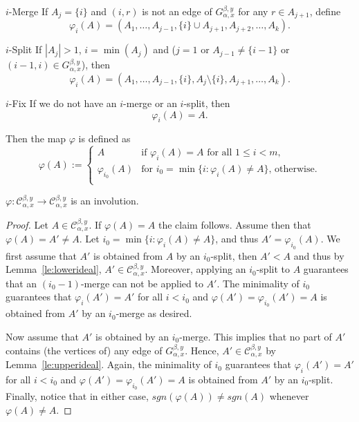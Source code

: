 \documentclass[ALCO,ThmDefs,Unicode,epreuves]{cedram}
\begin{document}
\begin{enonce*}{$i$-Merge} If $A_j=\{i\}$ and $(i,r)$ is not an edge of $G_{\alpha,x}^{\beta,y}$ for any $r\in A_{j+1}$, 
define
 $$ \varphi_i(A)=(A_1,\ldots,A_{j-1},\{i\}\cup A_{j+1},A_{j+2},\ldots, A_k).$$
\end{enonce*}


\begin{enonce*}{$i$-Split} If $|A_j|>1$, $i=\min(A_j)$ and \big($j=1$ or $A_{j-1}\ne\{i-1\}$ or $(i-1,i)\in G_{\alpha,x}^{\beta,y}$\big), then
 $$ \varphi_i(A)=(A_1,\ldots,A_{j-1},\{i\},A_{j}\setminus\{i\},A_{j+1},\ldots, A_k).$$
\end{enonce*}
 
\begin{enonce*}{$i$-Fix} If we do not have an $i$-merge or an $i$-split, then
 $$\varphi_i(A)=A.$$
\end{enonce*}
 
 Then the map $\varphi$ is defined as
 \begin{equation}\label{eq:involution}
 \varphi(A):=\begin{cases}
 A & \text{if $\varphi_i(A)=A$ for all $1\le i<m$,}\\
 \varphi_{i_0}(A) & \text{for $i_0=\min\big\{i:\varphi_i(A)\ne A\big\}$, otherwise.}\\
 \end{cases}
 \end{equation}

\begin{lemma}\label{le:involution}
 $\varphi\colon \mathcal{C}_{\alpha,x}^{\beta,y} \to \mathcal{C}_{\alpha,x}^{\beta,y}$ is an involution.
\end{lemma}
 
\begin{proof} Let $A\in \mathcal{C}_{\alpha,x}^{\beta,y}$. If $\varphi(A)=A$ the claim follows. Assume then that $\varphi(A)=A'\ne A$. Let $i_0=\min\big\{i:\varphi_i(A)\ne A\big\}$, and thus $A'= \varphi_{i_0}(A)$. We first assume that $A'$ is obtained from $A$ by an $i_0$-split, then $A'<A$ and thus by Lemma~\ref{le:lowerideal}, $A' \in \mathcal{C}_{\alpha,x}^{\beta,y}$. Moreover, applying an $i_0$-split to $A$ guarantees that an $(i_0-1)$-merge can not be applied to $A'$. The minimality of $i_0$ guarantees that $\varphi_i(A')=A'$ for all $i<i_0$ and $\varphi(A')=\varphi_{i_0}(A')=A$ is obtained from $A'$ by an $i_0$-merge as desired.

Now assume that $A'$ is obtained by an $i_0$-merge. This implies that no part of $A'$ contains (the vertices of) any edge of $G_{\alpha,x}^{\beta,y}$. Hence, $A' \in \mathcal{C}_{\alpha,x}^{\beta,y}$ by Lemma~\ref{le:upperideal}. Again, the minimality of $i_0$ guarantees that $\varphi_i(A')=A'$ for all $i<i_0$ and $\varphi(A')=\varphi_{i_0}(A')=A$ is obtained from $A'$ by an $i_0$-split. Finally, notice that in either case, $sgn( \varphi(A))\neq sgn(A)$ whenever $ \varphi(A)\neq A$.
\end{proof}
\end{document}
